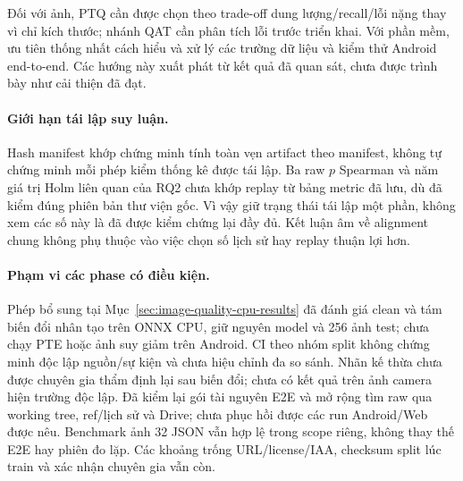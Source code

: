 Đối với ảnh, PTQ cần được chọn theo trade-off dung lượng/recall/lỗi nặng thay vì chỉ kích thước; nhánh QAT cần phân tích lỗi trước triển khai. Với phần mềm, ưu tiên thống nhất cách hiểu và xử lý các trường dữ liệu và kiểm thử Android end-to-end. Các hướng này xuất phát từ kết quả đã quan sát, chưa được trình bày như cải thiện đã đạt.

\paragraph{Giới hạn tái lập suy luận.} Hash manifest khớp chứng minh tính toàn vẹn artifact theo manifest, không tự chứng minh mỗi phép kiểm thống kê được tái lập. Ba raw $p$ Spearman và năm giá trị Holm liên quan của RQ2 chưa khớp replay từ bảng metric đã lưu, dù đã kiểm đúng phiên bản thư viện gốc. Vì vậy giữ trạng thái tái lập một phần, không xem các số này là đã được kiểm chứng lại đầy đủ. Kết luận âm về alignment chung không phụ thuộc vào việc chọn số lịch sử hay replay thuận lợi hơn.


\paragraph{Phạm vi các phase có điều kiện.} Phép bổ sung tại Mục~\ref{sec:image-quality-cpu-results} đã đánh giá clean và tám biến đổi nhân tạo trên ONNX CPU, giữ nguyên model và 256 ảnh test; chưa chạy PTE hoặc ảnh suy giảm trên Android. CI theo nhóm split không chứng minh độc lập nguồn/sự kiện và chưa hiệu chỉnh đa so sánh. Nhãn kế thừa chưa được chuyên gia thẩm định lại sau biến đổi; chưa có kết quả trên ảnh camera hiện trường độc lập. Đã kiểm lại gói tài nguyên E2E và mở rộng tìm raw qua working tree, ref/lịch sử và Drive; chưa phục hồi được các run Android/Web được nêu. Benchmark ảnh 32 JSON vẫn hợp lệ trong scope riêng, không thay thế E2E hay phiên đo lặp. Các khoảng trống URL/license/IAA, checksum split lúc train và xác nhận chuyên gia vẫn còn.
